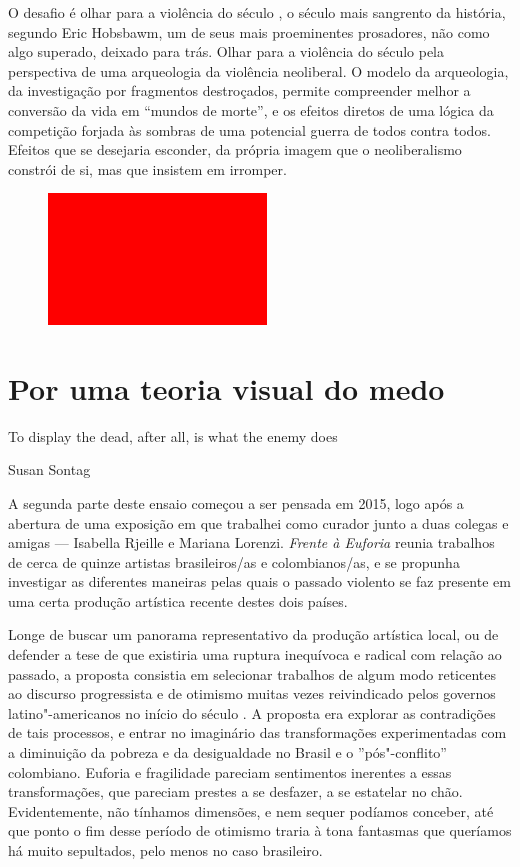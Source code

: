 O desafio é olhar para a violência do século , o século mais sangrento
da história, segundo Eric Hobsbawm, um de seus mais proeminentes
prosadores, não como algo superado, deixado para trás. Olhar para a
violência do século  pela perspectiva de uma arqueologia da violência
neoliberal. O modelo da arqueologia, da investigação por fragmentos
destroçados, permite compreender melhor a conversão da vida em ``mundos
de morte'', e os efeitos diretos de uma lógica da competição forjada às
sombras de uma potencial guerra de todos contra todos. Efeitos que se
desejaria esconder, da própria imagem que o neoliberalismo constrói de
si, mas que insistem em irromper.

\begin{figure}[!ht]
\centering
 \includegraphics[width=58mm]{./imgs/im1.jpg}
\caption{\footnotesize{}}
\end{figure}

\section{Por uma teoria visual do medo}

\epigraph{To display the dead, after all, is what the enemy does}{Susan Sontag}

A segunda parte deste ensaio começou a ser pensada em 2015, logo após a
abertura de uma exposição em que trabalhei como curador junto a duas
colegas e amigas --- Isabella Rjeille e Mariana Lorenzi. \emph{Frente à
Euforia} reunia trabalhos de cerca de quinze artistas brasileiros/as e
colombianos/as, e se propunha investigar as diferentes maneiras pelas
quais o passado violento se faz presente em uma certa produção artística
recente destes dois países.

Longe de buscar um panorama representativo da produção artística local,
ou de defender a tese de que existiria uma ruptura inequívoca e radical
com relação ao passado, a proposta consistia em selecionar trabalhos de
algum modo reticentes ao discurso progressista e de otimismo muitas
vezes reivindicado pelos governos latino"-americanos no início do século
. A proposta era explorar as contradições de tais processos, e entrar
no imaginário das transformações experimentadas com a diminuição da
pobreza e da desigualdade no Brasil e o ''pós"-conflito'' colombiano.
Euforia e fragilidade pareciam sentimentos inerentes a essas
transformações, que pareciam prestes a se desfazer, a se estatelar no
chão. Evidentemente, não tínhamos dimensões, e nem sequer podíamos
conceber, até que ponto o fim desse período de otimismo traria à tona
fantasmas que queríamos há muito sepultados, pelo menos no caso
brasileiro.

